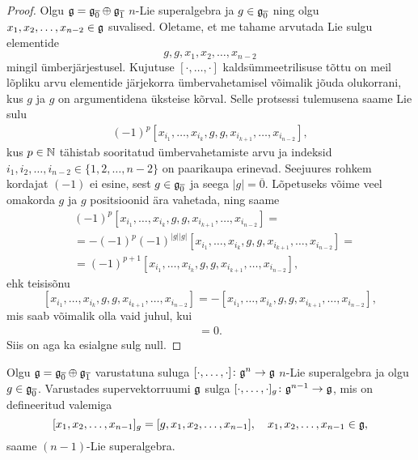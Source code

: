 \begin{proof}
    Olgu $\mathfrak{g} = \mathfrak{g}_{\overline{0}} \oplus \mathfrak{g}_{\overline{1}}$
    $n$-Lie superalgebra ja $g \in \mathfrak{g}_{\overline{0}}$ ning olgu
    $x_1, x_2, \dots, x_{n-2} \in \mathfrak{g}$ suvalised. Oletame, et me
    tahame arvutada Lie sulgu elementide
    \[ g, g, x_1, x_2, \dots, x_{n-2} \]
    mingil ümberjärjestusel. Kujutuse $[\cdot, \dots, \cdot]$
    kaldsümmeetrilisuse tõttu on meil lõpliku arvu elementide
    järjekorra ümbervahetamisel võimalik jõuda olukorrani, kus
    $g$ ja $g$ on argumentidena üksteise kõrval. Selle protsessi
    tulemusena saame Lie sulu
    \begin{align*}
        (-1)^p [x_{i_1}, \dots, x_{i_k}, g, g,
            x_{i_{k+1}}, \dots, x_{i_{n-2}}],
    \end{align*}
    kus $p \in \mathbb{N}$ tähistab sooritatud ümbervahetamiste arvu
    ja indeksid $i_1, i_2, \dots, i_{n-2} \in \{1, 2, \dots, n-2\}$ on
    paarikaupa erinevad. Seejuures rohkem kordajat $(-1)$ ei esine,
    sest $g \in \mathfrak{g}_{\overline{0}}$ ja seega $|g| = \overline{0}$.
    Lõpetuseks võime veel omakorda $g$ ja $g$ positsioonid ära
    vahetada, ning saame
    \begin{align*}
        &(-1)^p [x_{i_1}, \dots, x_{i_k}, g, g,
            x_{i_{k+1}}, \dots, x_{i_{n-2}}] = \\
        &= -(-1)^p (-1)^{|g||g|} [x_{i_1}, \dots,
            x_{i_k}, g, g, x_{i_{k+1}}, \dots, x_{i_{n-2}}] = \\
        &= (-1)^{p+1} [x_{i_1}, \dots,
            x_{i_k}, g, g, x_{i_{k+1}}, \dots, x_{i_{n-2}}],
    \end{align*}
    ehk teisisõnu
    \[
        [x_{i_1}, \dots, x_{i_k}, g, g, x_{i_{k+1}},
        \dots, x_{i_{n-2}}] =
        -[x_{i_1}, \dots, x_{i_k}, g, g, x_{i_{k+1}},
        \dots, x_{i_{n-2}}],
    \]
    mis saab võimalik olla vaid juhul, kui
    \begin{align*}
        [x_{i_1}, \dots, x_{i_k}, g, g, x_{i_{k+1}},
        \dots, x_{i_{n-2}}] = 0.
    \end{align*}
    Siis on aga ka esialgne sulg null.
\end{proof}

\begin{lau}
    Olgu $\mathfrak{g} = \mathfrak{g}_{\overline{0}} \oplus \mathfrak{g}_{\overline{1}}$ varustatuna
    suluga $[\cdot, \dots, \cdot] \colon \mathfrak{g}^n \to \mathfrak{g}$ $n$-Lie
    superalgebra ja olgu $g \in \mathfrak{g}_{\overline{0}}$. Varustades
    supervektorruumi $\mathfrak{g}$ sulga
    $[\cdot, \dots, \cdot]_g \colon \mathfrak{g}^{n-1} \to \mathfrak{g}$, mis on
    defineeritud valemiga
    \[
        [x_1, x_2, \dots, x_{n-1}]_g = [g, x_1, x_2, \dots, x_{n-1}],
        \quad x_1, x_2, \dots, x_{n-1} \in \mathfrak{g},
    \]
    saame $(n-1)$-Lie superalgebra.
\end{lau}

